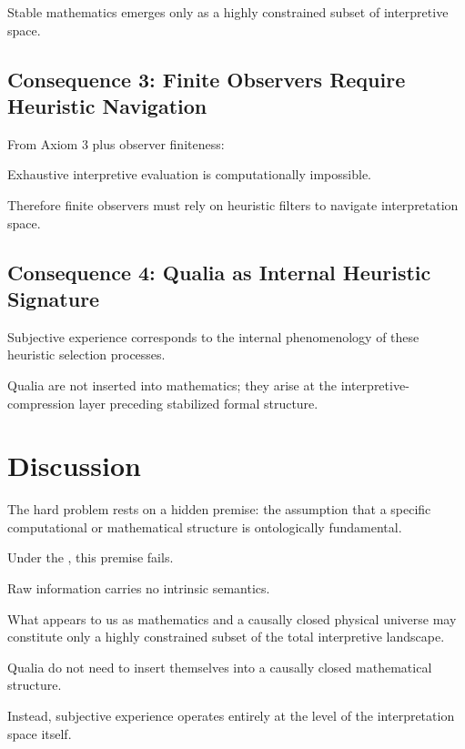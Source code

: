 Stable mathematics emerges only as a highly constrained subset of interpretive space.


\subsection*{Consequence 3: Finite Observers Require Heuristic Navigation}

From Axiom 3 plus observer finiteness:

Exhaustive interpretive evaluation is computationally impossible.

Therefore finite observers must rely on heuristic filters to navigate interpretation space.


\subsection*{Consequence 4: Qualia as Internal Heuristic Signature}

Subjective experience corresponds to the internal phenomenology of these heuristic selection processes.

Qualia are not inserted into mathematics;
they arise at the interpretive-compression layer preceding stabilized formal structure.




\section{Discussion}

The hard problem rests on a hidden premise: the assumption that a specific computational or mathematical structure is ontologically fundamental. 

Under the , this premise fails.

Raw information carries no intrinsic semantics.

What appears to us as mathematics and a causally closed physical universe may constitute only a highly constrained subset of the total interpretive landscape.

Qualia do not need to insert themselves into a causally closed mathematical structure.

Instead, subjective experience operates entirely at the level of the interpretation space itself.


